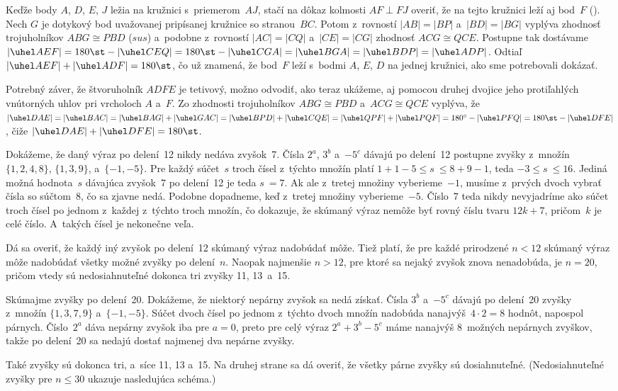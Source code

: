 {%
Keďže body $A$, $D$, $E$, $J$ ležia na kružnici s~priemerom~$AJ$, stačí
na dôkaz kolmosti $AF \perp FJ$ overiť, že
na tejto kružnici leží aj bod~$F$ (\obr). Nech $G$ je dotykový bod
uvažovanej pripísanej kružnice so stranou~$BC$. Potom z~rovností $|AB| = |BP|$
a~$|BD| = |BG|$
vyplýva zhodnosť trojuholníkov $ABG\cong PBD$ ($sus$) a~podobne z~rovností $|AC| = |CQ|$
a~$|CE| = |CG|$ zhodnosť $ACG\cong QCE$.
Postupne tak dostávame
$|\uhel AEF| = 180\st-|\uhel CEQ|= 180\st-|\uhel CGA|
=|\uhel BGA|=|\uhel BDP|=|\uhel ADP|$.
Odtiaľ $|\uhel AEF|+|\uhel ADF|=180\st$, čo už znamená, že bod~$F$ leží
s~bodmi $A$, $E$, $D$ na jednej kružnici, ako sme potrebovali dokázať.
%

\poznamka
Potrebný záver, že štvoruholník $ADFE$ je tetivový, možno odvodiť, ako teraz ukážeme,
aj pomocou druhej dvojice jeho protiľahlých vnútorných uhlov pri vrcholoch $A$ a~$F$.
Zo zhodnosti trojuholníkov $ABG\cong PBD$ a~$ACG\cong QCE$
vyplýva, že $|\uhel DAE|=|\uhel BAC|=|\uhel BAG|+|\uhel GAC|=
|\uhel BPD|+|\uhel CQE| =|\uhel QPF|+|\uhel PQF|= {180^\circ- |\uhel PFQ|}
=180\st-|\uhel DFE|$, čiže $|\uhel DAE|+|\uhel DFE|=180\st$.
}

{%
Dokážeme, že daný výraz po delení~12 nikdy nedáva zvyšok~7.
Čísla $2^a$, $3^b$ a~$-5^c$ dávajú po delení~12
postupne zvyšky z~množín $\{1,2,4,8\}$, $\{1,3,9\}$, a~$\{{-1},{-5}\}$.
Pre každý súčet~$s$ troch čísel z~týchto množín platí $1+1-5
\le s~\le 8+9-1$, teda ${-3} \le s~\le 16$. Jediná možná
hodnota~$s$ dávajúca zvyšok~7 po delení~12 je teda $s~= 7$. Ak ale
z~tretej množiny vyberieme~${-1}$, musíme z~prvých dvoch vybrať
čísla so súčtom~8, čo sa zjavne nedá. Podobne dopadneme, keď
z~tretej množiny vyberieme~${-5}$. Číslo~7 teda nikdy nevyjadríme ako
súčet troch čísel po jednom z~každej z~týchto troch množín,
čo dokazuje, že skúmaný výraz
nemôže byť rovný číslu tvaru $12k+7$, pričom~$k$ je celé číslo.
A~takých čísel je nekonečne veľa.

\poznamka
Dá sa overiť, že každý iný zvyšok po delení~12
skúmaný výraz nadobúdať môže. Tiež platí, že pre každé
prirodzené $n <12$ skúmaný výraz môže nadobúdať všetky možné
zvyšky po delení~$n$. Naopak najmenšie $n> 12$, pre ktoré sa
nejaký zvyšok znova nenadobúda, je $n=20$, pričom vtedy sú
nedosiahnuteľné dokonca tri zvyšky 11, 13~a~15.

\ineres
Skúmajme zvyšky po delení~20. Dokážeme, že niektorý
nepárny zvyšok sa nedá získať. Čísla $3^b$ a~$-5^c$
dávajú po delení~20 zvyšky z~množín $\{{1, 3, 7, 9}\}$
a~$\{{-1},{-5}\}$. Súčet dvoch čísel po jednom z~týchto dvoch množín nadobúda
nanajvýš~$4 \cdot 2 = 8$ hodnôt, napospol párnych. Číslo~$2^a$ dáva
nepárny zvyšok iba pre $a= 0$, preto pre celý výraz ${2^a+3^b-5^c}$
máme nanajvýš 8~možných nepárnych zvyškov, takže po delení~20
sa nedajú dostať najmenej dva nepárne zvyšky.

\poznamka
Také zvyšky sú dokonca tri, a~síce 11, 13 a~15. Na druhej
strane sa dá overiť, že všetky párne zvyšky sú dosiahnuteľné.
(Nedosiahnuteľné zvyšky pre $n\le30$ ukazuje nasledujúca schéma.)
%
}

